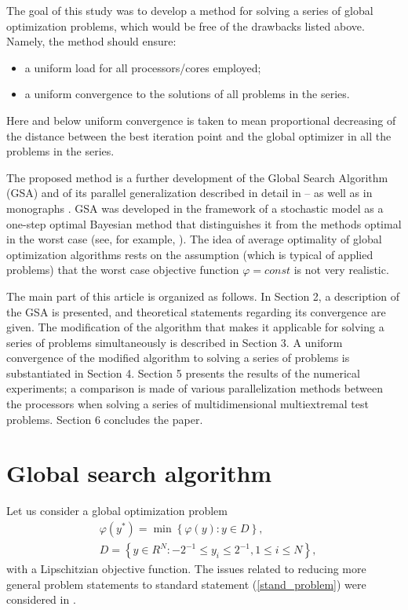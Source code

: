 \documentclass[smallcondensed]{svjour3}     %
\begin{document}
The goal of this study was to develop a method for solving a series of global optimization problems, which would be free of the drawbacks listed above. Namely, the method should ensure: 
\begin{itemize}
	\item a uniform load for all processors/cores employed;
	\item a uniform convergence to the solutions of all problems in the series.
\end{itemize} 
Here and below uniform convergence is taken to mean proportional decreasing of the distance between the best iteration point and the global optimizer in all the problems in the series.

The proposed method is a further development of the Global Search Algorithm (GSA) and of its parallel generalization described in detail in \cite{Sergeyev1994}--\cite{Barkalov2016} as well as in monographs \cite{Strongin2000,Sergeyev2013}.
GSA was developed in the framework of a stochastic model as a one-step optimal Bayesian method that distinguishes it from the methods optimal in the worst case (see, for example, \cite{Zilinskas2013}). The idea of average optimality of global optimization algorithms rests on the assumption (which is typical of applied problems) that the worst case objective function $\varphi=const$ is not very realistic.

The main part of this article is organized as follows. In Section 2, a description of the GSA is presented, and theoretical statements regarding its convergence are given. The modification of the algorithm that makes it applicable for solving a series of problems simultaneously is described in Section 3. A uniform convergence of the modified algorithm to solving a series of problems is substantiated in Section 4. Section 5 presents the results of the numerical experiments; a comparison is made of various parallelization methods between the processors when solving a series of multidimensional multiextremal test problems. Section 6 concludes the paper.

\section{Global search algorithm} \label{sec:1}

Let us consider a global optimization problem 
\begin{eqnarray}\label{stand_problem}
& \varphi(y^\ast)=\min{\left\{\varphi(y):y\in D\right\}},\\
& D=\left\{y\in R^N: -2^{-1}\leq y_i \leq 2^{-1}, 1\leq i \leq N\right\}, \nonumber
\end{eqnarray}
with a Lipschitzian objective function. The issues related to reducing more general problem statements to standard statement (\ref{stand_problem}) were considered in \cite{Strongin2009}.
\end{document}
